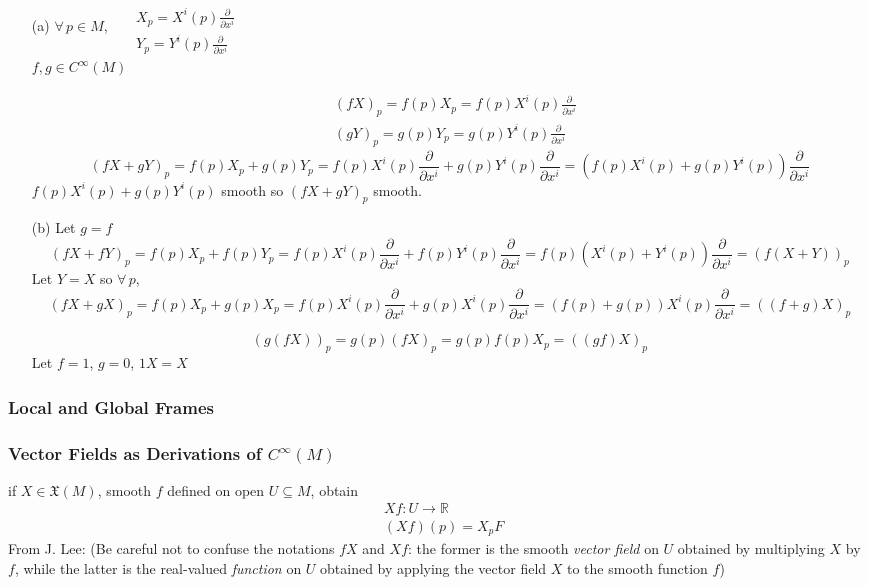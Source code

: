 
\begin{enumerate}
\item[(a)] $\forall \, p \in M$, \, $\begin{aligned} & \quad \\
  & X_p = X^i(p) \frac{ \partial }{ \partial x^i} \\
  & Y_p = Y^i(p) \frac{ \partial }{ \partial x^i } \end{aligned}$ \\
$f,g \in C^{\infty}{(M)}$

\[
\begin{aligned}
  & (fX)_p = f(p)X_p = f(p) X^i(p) \frac{ \partial }{ \partial x^i } \\ 
  & (gY)_p = g(p)Y_p = g(p)Y^i(p) \frac{ \partial }{ \partial x^i }
\end{aligned}
\]
\[
(fX + gY)_p  = f(p)X_p + g(p)Y_p = f(p) X^i(p) \frac{ \partial}{ \partial x^i} + g(p)Y^i(p) \frac{ \partial }{ \partial x^i } = (f(p)X^i(p) + g(p) Y^i(p)) \frac{ \partial }{ \partial x^i }
\]
$f(p)X^i(p) + g(p)Y^i(p)$ smooth so $(fX+gY)_p$ smooth.
\item[(b)] Let $g=f$ 
\[
(fX+fY)_p = f(p)X_p + f(p)Y_p = f(p)X^i(p) \frac{ \partial }{ \partial x^i} + f(p)Y^i(p)\frac{ \partial}{\partial x^i} = f(p)(X^i(p) + Y^i(p))\frac{ \partial }{ \partial x^i } = (f(X+Y))_p
\]
Let $Y=X$ so $\forall \, p$, 
\[
(fX+gX)_p  = f(p)X_p + g(p)X_p = f(p)X^i(p)\frac{ \partial}{ \partial x^i} +g(p)X^i(p) \frac{ \partial }{ \partial x^i} = (f(p) + g(p))X^i(p)\frac{ \partial }{ \partial x^i } = ((f+g)X)_p
\]

\[
(g(fX))_p = g(p)(fX)_p= g(p)f(p)X_p = ((gf)X)_p
\]
Let $f=1$, $g=0$, $1X=X$
\end{enumerate}





\hrulefill

\subsubsection*{Local and Global Frames}

\subsubsection*{Vector Fields as Derivations of $C^{\infty}(M)$}

if $X \in \mathfrak{X}(M)$, smooth $f$ defined on open $U\subseteq M$, obtain
\[
\begin{aligned}
  & Xf : U \to \mathbb{R} \\  
  & (Xf)(p) = X_p F
\end{aligned}
\]
From J. Lee: (Be careful not to confuse the notations $fX$ and $Xf$: the former is the smooth \emph{vector field} on $U$ obtained by multiplying $X$ by $f$, while the latter is the real-valued \emph{function} on $U$ obtained by applying the vector field $X$ to the smooth function $f$)

